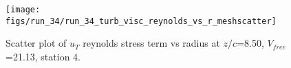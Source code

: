 \begin{figure}[H]
\centering
\texttt{[image: figs/run\_34/run\_34\_turb\_visc\_reynolds\_vs\_r\_meshscatter]}
\caption{Scatter plot of $
u_T$ reynolds stress term vs radius at $z/c$=8.50, $V_{free}$=21.13, station 4.}
\label{fig:run_34_turb_visc_reynolds_vs_r_meshscatter}
\end{figure}


